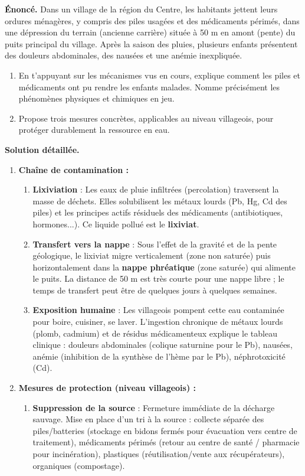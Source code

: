 \documentclass[11pt]{article}
\begin{document}
\begin{exoresolu}
\textbf{Énoncé.} Dans un village de la région du Centre, les habitants jettent leurs ordures ménagères, y compris des piles usagées et des médicaments périmés, dans une dépression du terrain (ancienne carrière) située à 50 m en amont (pente) du puits principal du village. Après la saison des pluies, plusieurs enfants présentent des douleurs abdominales, des nausées et une anémie inexpliquée. 
\begin{enumerate}
\item En t'appuyant sur les mécanismes vus en cours, explique comment les piles et médicaments ont pu rendre les enfants malades. Nomme précisément les phénomènes physiques et chimiques en jeu.
\item Propose trois mesures concrètes, applicables au niveau villageois, pour protéger durablement la ressource en eau.
\end{enumerate}
\tcblower
\textbf{Solution détaillée.}
\begin{enumerate}
\item \textbf{Chaîne de contamination :}
\begin{enumerate}
\item \textbf{Lixiviation} : Les eaux de pluie infiltrées (percolation) traversent la masse de déchets. Elles solubilisent les métaux lourds (Pb, Hg, Cd des piles) et les principes actifs résiduels des médicaments (antibiotiques, hormones...). Ce liquide pollué est le \textbf{lixiviat}.
\item \textbf{Transfert vers la nappe} : Sous l'effet de la gravité et de la pente géologique, le lixiviat migre verticalement (zone non saturée) puis horizontalement dans la \textbf{nappe phréatique} (zone saturée) qui alimente le puits. La distance de 50 m est très courte pour une nappe libre ; le temps de transfert peut être de quelques jours à quelques semaines.
\item \textbf{Exposition humaine} : Les villageois pompent cette eau contaminée pour boire, cuisiner, se laver. L'ingestion chronique de métaux lourds (plomb, cadmium) et de résidus médicamenteux explique le tableau clinique : douleurs abdominales (colique saturnine pour le Pb), nausées, anémie (inhibition de la synthèse de l'hème par le Pb), néphrotoxicité (Cd).
\end{enumerate}
\item \textbf{Mesures de protection (niveau villageois) :}
\begin{enumerate}
\item \textbf{Suppression de la source} : Fermeture immédiate de la décharge sauvage. Mise en place d'un tri à la source : collecte séparée des piles/batteries (stockage en bidons fermés pour évacuation vers centre de traitement), médicaments périmés (retour au centre de santé / pharmacie pour incinération), plastiques (réutilisation/vente aux récupérateurs), organiques (compostage).

\end{enumerate}
\end{enumerate}
\end{exoresolu}
\end{document}
